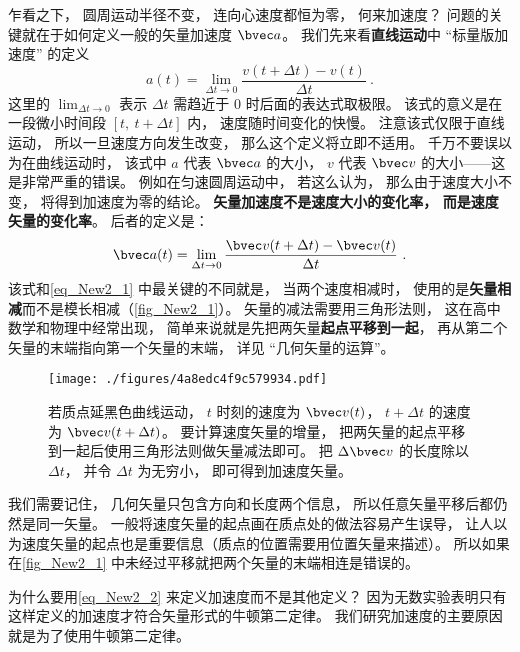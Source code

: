 乍看之下， 圆周运动半径不变， 连向心速度都恒为零， 何来加速度？ 问题的关键就在于如何定义一般的矢量加速度 $\bvec a$。 我们先来看\textbf{直线运动}中 “标量版加速度” 的定义
\begin{equation}\label{eq_New2_1}
a(t) = \lim_{\Delta t\to 0}\frac{v(t+\Delta t) - v(t)}{\Delta t}~.
\end{equation}
这里的 $\lim_{\Delta t\to 0}$ 表示 $\Delta t$ 需趋近于 0 时后面的表达式取极限。 该式的意义是在一段微小时间段 $[t,\ t+\Delta t]$ 内， 速度随时间变化的快慢。 注意该式仅限于直线运动， 所以一旦速度方向发生改变， 那么这个定义将立即不适用。 千万不要误以为在曲线运动时， 该式中 $a$ 代表 $\bvec a$ 的大小， $v$ 代表 $\bvec v$ 的大小——这是非常严重的错误。 例如在匀速圆周运动中， 若这么认为， 那么由于速度大小不变， 将得到加速度为零的结论。 \textbf{矢量加速度不是速度大小的变化率， 而是速度矢量的变化率}。 后者的定义是：
\begin{equation}\label{eq_New2_2}
\bvec a(t) = \lim_{\Delta t\to 0}\frac{\bvec v(t+\Delta t) - \bvec v(t)}{\Delta t}~.
\end{equation}
该式和\autoref{eq_New2_1} 中最关键的不同就是， 当两个速度相减时， 使用的是\textbf{矢量相减}而不是模长相减（\autoref{fig_New2_1}）。 矢量的减法需要用三角形法则， 这在高中数学和物理中经常出现， 简单来说就是先把两矢量\textbf{起点平移到一起}， 再从第二个矢量的末端指向第一个矢量的末端， 详见 “几何矢量的运算”。

\begin{figure}[ht]
\centering
\texttt{[image: ./figures/4a8edc4f9c579934.pdf]}
\caption{若质点延黑色曲线运动， $t$ 时刻的速度为 $\bvec v(t)$， $t+\Delta t$ 的速度为 $\bvec v(t+\Delta t)$。 要计算速度矢量的增量， 把两矢量的起点平移到一起后使用三角形法则做矢量减法即可。 把 $\Delta \bvec v$ 的长度除以 $\Delta t$， 并令 $\Delta t$ 为无穷小， 即可得到加速度矢量。} \label{fig_New2_1}
\end{figure}

我们需要记住， 几何矢量只包含方向和长度两个信息， 所以任意矢量平移后都仍然是同一矢量。 一般将速度矢量的起点画在质点处的做法容易产生误导， 让人以为速度矢量的起点也是重要信息（质点的位置需要用位置矢量来描述）。 所以如果在\autoref{fig_New2_1} 中未经过平移就把两个矢量的末端相连是错误的。

为什么要用\autoref{eq_New2_2} 来定义加速度而不是其他定义？ 因为无数实验表明只有这样定义的加速度才符合矢量形式的牛顿第二定律。 我们研究加速度的主要原因就是为了使用牛顿第二定律。

